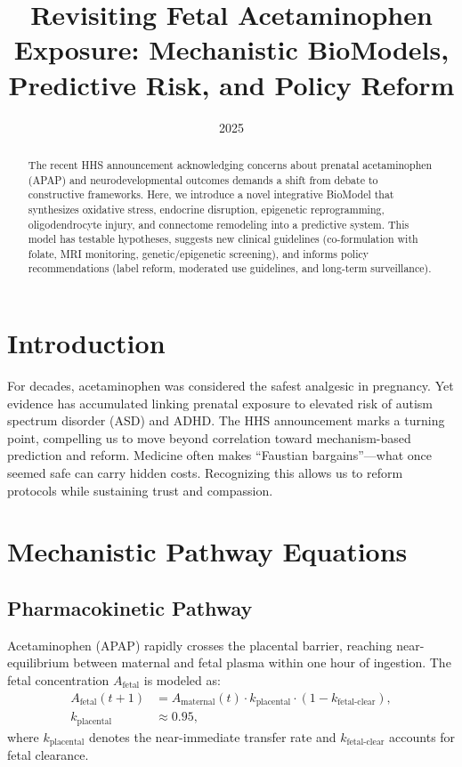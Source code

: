 \documentclass[12pt]{article}
\title{Revisiting Fetal Acetaminophen Exposure: Mechanistic BioModels, Predictive Risk, and Policy Reform}
\author{}
\date{2025}
\begin{document}
\maketitle

\begin{abstract}
The recent HHS announcement acknowledging concerns about prenatal acetaminophen (APAP) and neurodevelopmental outcomes demands a shift from debate to constructive frameworks. Here, we introduce a novel integrative BioModel that synthesizes oxidative stress, endocrine disruption, epigenetic reprogramming, oligodendrocyte injury, and connectome remodeling into a predictive system. This model has testable hypotheses, suggests new clinical guidelines (co-formulation with folate, MRI monitoring, genetic/epigenetic screening), and informs policy recommendations (label reform, moderated use guidelines, and long-term surveillance).
\end{abstract}

\section{Introduction}
For decades, acetaminophen was considered the safest analgesic in pregnancy. Yet evidence has accumulated linking prenatal exposure to elevated risk of autism spectrum disorder (ASD) and ADHD. The HHS announcement marks a turning point, compelling us to move beyond correlation toward mechanism-based prediction and reform. Medicine often makes ``Faustian bargains''---what once seemed safe can carry hidden costs. Recognizing this allows us to reform protocols while sustaining trust and compassion. 



\section{Mechanistic Pathway Equations}

\subsection{Pharmacokinetic Pathway}
Acetaminophen (APAP) rapidly crosses the placental barrier, reaching near-equilibrium between maternal and fetal plasma within one hour of ingestion. The fetal concentration $A_{\text{fetal}}$ is modeled as:
\begin{align}
A_{\text{fetal}}(t+1) &= A_{\text{maternal}}(t) \cdot k_{\text{placental}} \cdot \left( 1 - k_{\text{fetal-clear}} \right), \\
k_{\text{placental}} &\approx 0.95,
\end{align}
where $k_{\text{placental}}$ denotes the near-immediate transfer rate and $k_{\text{fetal-clear}}$ accounts for fetal clearance.
\end{document}
